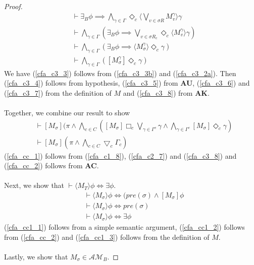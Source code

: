 \documentclass[12pt, a4paper, titlepage]{scrartcl}
\numberwithin{equation}{section}
\newcommand{\cover}{\bigtriangledown}
\newcommand{\sqex}[1]{[{#1}]}
\newcommand{\anex}[1]{\langle {#1} \rangle}
\newcommand{\axAC}{{\bf AC}}
\newcommand{\axAK}{{\bf AK}}
\newcommand{\axAU}{{\bf AU}}
\newcommand{\eventClass}{\mathcal{AM}}
\begin{document}
\begin{proof}
\begin{align}
	& \vdash \exists_B \phi \implies \bigwedge_{\gamma \in \Gamma} \Diamond_c \anex{
	\bigvee_{v \in \sigma R} M^\gamma_{v} } \gamma\label{cfa_c3_5}\\
	& \vdash \bigwedge_{\gamma \in \Gamma} (\exists_B \phi \implies \bigvee_{v \in \sigma R_c}
	\Diamond_c \anex{ M^\gamma_{v} } \gamma)\label{cfa_c3_6}\\
	& \vdash \bigwedge_{\gamma \in \Gamma} (\exists_B \phi \implies \anex{ M^\gamma_{\sigma}
	} \Diamond_c \gamma)\label{cfa_c3_7}\\
	& \vdash \bigwedge_{\gamma \in \Gamma} ([M^\gamma_{\sigma}] \Diamond_c \gamma)\label{cfa_c3_8}
\end{align}
We have (\ref{cfa_c3_3}) follows from (\ref{cfa_c3_3b}) and (\ref{cfa_c3_2a}).
Then (\ref{cfa_c3_4}) follows from hypothesis, (\ref{cfa_c3_5}) from \axAU, (\ref{cfa_c3_6}) and
(\ref{cfa_c3_7}) from the definition of $M$ and (\ref{cfa_c3_8}) from \axAK.\\
\\
Together, we combine our result to show
\begin{align}
	& \vdash \sqex{M_\sigma} (\pi \land \bigwedge_{c \in C} \left( \sqex{M_\sigma} \Box_c \bigvee_{\gamma \in
		\Gamma^c} \gamma \land
	\bigwedge_{\gamma \in \Gamma^c} \sqex{M_\sigma} \Diamond_c \gamma \right) \label{cfa_cc_1} \\
	& \vdash \sqex{M_\sigma}(\pi \land \bigwedge_{c \in C} \cover_c \Gamma_c) \label{cfa_cc_2}
\end{align}
(\ref{cfa_cc_1}) follows from (\ref{cfa_c1_8}), (\ref{cfa_c2_7}) and (\ref{cfa_c3_8}) and
(\ref{cfa_cc_2}) follows from \axAC.\\
\\
Next, we show that $\vdash \anex{ M_T } \phi \iff \exists \phi$.
\begin{align}
	& \vdash \anex{ M_\sigma } \phi \iff (pre(\sigma) \land [ M_\sigma ] \phi \label{cfa_cc1_1}\\
	& \vdash \anex{ M_\sigma } \phi \iff pre(\sigma) \label{cfa_cc1_2}\\
	& \vdash \anex{ M_\sigma } \phi \iff \exists \phi\label{cfa_cc1_3}
\end{align}
(\ref{cfa_cc1_1}) follows from a simple semantic argument, (\ref{cfa_cc1_2}) follows from
(\ref{cfa_cc_2}) and (\ref{cfa_cc1_3}) follows from the definition of $M$.\\
\\
Lastly, we show that $M_\sigma \in \eventClass_B$.
\end{proof}
\end{document}
